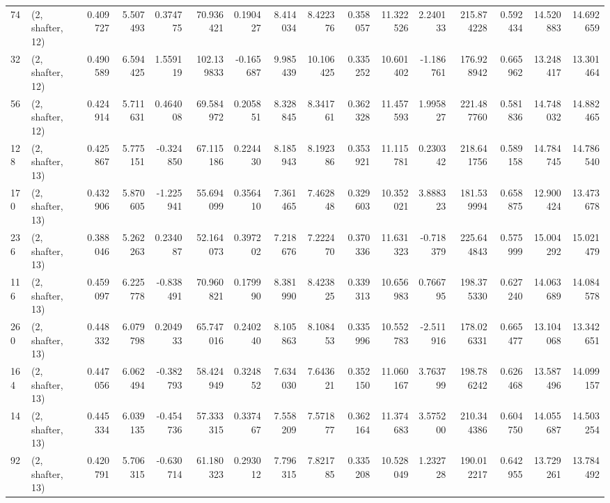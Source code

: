 \begin{tabular}{llrrrrrrrrrrrrrr}
74  &  (2, shafter, 12) &   0.409727 &   5.507493 &   0.374775 &    70.936421 &   0.190427 &   8.414034 &   8.422376 &  0.358057 &  11.322526 &   2.240133 &   215.874228 &  0.592434 &  14.520883 &  14.692659 \\
32  &  (2, shafter, 12) &   0.490589 &   6.594425 &   1.559119 &   102.139833 &  -0.165687 &   9.985439 &  10.106425 &  0.335252 &  10.601402 &  -1.186761 &   176.928942 &  0.665962 &  13.248417 &  13.301464 \\
56  &  (2, shafter, 12) &   0.424914 &   5.711631 &   0.464008 &    69.584972 &   0.205851 &   8.328845 &   8.341761 &  0.362328 &  11.457593 &   1.995827 &   221.487760 &  0.581836 &  14.748032 &  14.882465 \\
128 &  (2, shafter, 13) &   0.425867 &   5.775151 &  -0.324850 &    67.115186 &   0.224430 &   8.185943 &   8.192386 &  0.353921 &  11.115781 &   0.230342 &   218.641756 &  0.589158 &  14.784745 &  14.786540 \\
170 &  (2, shafter, 13) &   0.432906 &   5.870605 &  -1.225941 &    55.694099 &   0.356410 &   7.361465 &   7.462848 &  0.329603 &  10.352021 &   3.888323 &   181.539994 &  0.658875 &  12.900424 &  13.473678 \\
236 &  (2, shafter, 13) &   0.388046 &   5.262263 &   0.234087 &    52.164073 &   0.397202 &   7.218676 &   7.222470 &  0.370336 &  11.631323 &  -0.718379 &   225.644843 &  0.575999 &  15.004292 &  15.021479 \\
116 &  (2, shafter, 13) &   0.459097 &   6.225778 &  -0.838491 &    70.960821 &   0.179990 &   8.381990 &   8.423825 &  0.339313 &  10.656983 &   0.766795 &   198.375330 &  0.627240 &  14.063689 &  14.084578 \\
260 &  (2, shafter, 13) &   0.448332 &   6.079798 &   0.204933 &    65.747016 &   0.240240 &   8.105863 &   8.108453 &  0.335996 &  10.552783 &  -2.511916 &   178.026331 &  0.665477 &  13.104068 &  13.342651 \\
164 &  (2, shafter, 13) &   0.447056 &   6.062494 &  -0.382793 &    58.424949 &   0.324852 &   7.634030 &   7.643621 &  0.352150 &  11.060167 &   3.763799 &   198.786242 &  0.626468 &  13.587496 &  14.099157 \\
14  &  (2, shafter, 13) &   0.445334 &   6.039135 &  -0.454736 &    57.333315 &   0.337467 &   7.558209 &   7.571877 &  0.362164 &  11.374683 &   3.575200 &   210.344386 &  0.604750 &  14.055687 &  14.503254 \\
92  &  (2, shafter, 13) &   0.420791 &   5.706315 &  -0.630714 &    61.180323 &   0.293012 &   7.796315 &   7.821785 &  0.335208 &  10.528049 &   1.232728 &   190.012217 &  0.642955 &  13.729261 &  13.784492 \\

\end{tabular}
